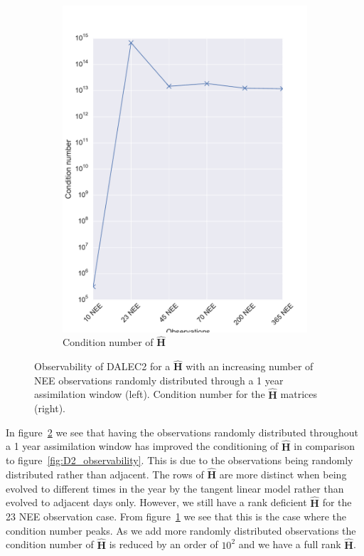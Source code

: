 \documentclass[11pt]{article}
\begin{document}
\begin{figure}[ht]
\begin{subfigure}[b]{0.49\textwidth}
        \includegraphics[width=\textwidth]{dalec2_obsrankcondwind.pdf}
        \caption{Condition number of $\hat{\textbf{H}}$}
        \label{fig:D2_observabilitycondwind}
    \end{subfigure}
    \caption{Observability of DALEC2 for a $\hat{\textbf{H}}$ with an increasing number of NEE observations randomly distributed through a 1 year assimilation window (left). Condition number for the $\hat{\textbf{H}}$ matrices (right).}
    \label{fig:D2_observabilitywind}
\end{figure}

In figure~\ref{fig:D2_observabilitywind} we see that having the observations randomly distributed throughout a 1 year assimilation window has improved the conditioning of $\hat{\textbf{H}}$ in comparison to figure~\ref{fig:D2_observability}. This is due to the observations being randomly distributed rather than adjacent. The rows of $\hat{\textbf{H}}$ are more distinct when being evolved to different times in the year by the tangent linear model rather than evolved to adjacent days only. However, we still have a rank deficient $\hat{\textbf{H}}$ for the 23 NEE observation case. From figure~\ref{fig:D2_observabilitycondwind} we see that this is the case where the condition number peaks. As we add more randomly distributed observations the condition number of $\hat{\textbf{H}}$ is reduced by an order of $10^{2}$ and we have a full rank $\hat{\textbf{H}}$. 
\end{document}
